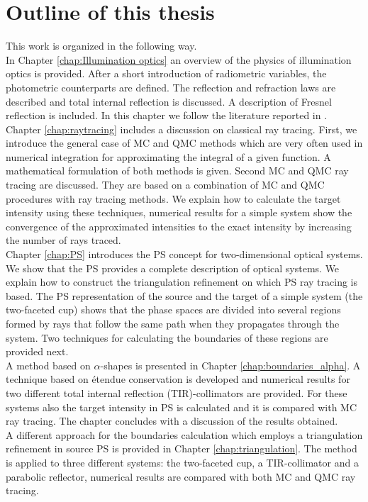 \section{Outline of this thesis}
This work is organized in the following way.\\ \indent
In Chapter \ref{chap:Illumination optics} an overview of the physics of illumination optics is provided. After a short introduction of radiometric variables, the photometric counterparts are defined. The reflection and refraction laws are described and total internal reflection is discussed. A description of Fresnel reflection is included. In this chapter we follow the literature reported in \cite{hecht1998hecht, feynman2011feynman, feynman1964feynman}.\\ \indent
Chapter \ref{chap:raytracing} includes a discussion on classical ray tracing. First, we introduce the general case of MC and QMC methods which are very often used in numerical integration for approximating the integral of a given function. A mathematical formulation of both methods is given. Second MC and QMC ray tracing are discussed. They are based on a combination of MC and QMC procedures with ray tracing methods. We explain how to calculate the target intensity using these techniques, numerical results for a simple system show the convergence of the approximated intensities to the exact intensity by increasing the number of rays traced.\\\indent
Chapter \ref{chap:PS} introduces the PS concept for two-dimensional optical systems. We show that the PS provides a complete description of optical systems. We explain how to construct the triangulation refinement on which PS ray tracing is based. The PS representation of the source and the target of a simple system (the two-faceted cup) shows that the phase spaces are divided into several regions formed by rays that follow the same path when they propagates through the system. Two techniques for calculating the boundaries of these regions are provided next. \\ \indent 
A method based on $\alpha$-shapes is presented in Chapter \ref{chap:boundaries_alpha}. A technique based on \'{e}tendue conservation is developed and numerical results for two different total internal reflection (TIR)-collimators are provided. For these systems also the target intensity in PS is calculated and it is compared with MC ray tracing. The chapter concludes with a discussion of the results obtained.\\ \indent
A different approach for the boundaries calculation which employs a triangulation refinement in source PS is provided in Chapter \ref{chap:triangulation}. The method is applied to three different systems: the two-faceted cup, a TIR-collimator and a parabolic reflector, numerical results are compared with both MC and QMC ray tracing.

